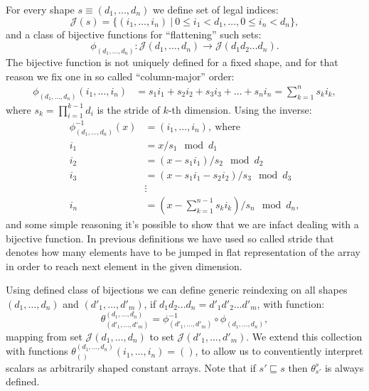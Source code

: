 \documentclass[a4paper, 10pt, draft]{report}
\begin{document}
For every shape $s \equiv (d_1, \ldots, d_n)$ we define set of legal indices:
\[
  \mathcal{J}\!(s) = \{ (i_1, \ldots, i_n)\ |\ 0 \leq i_1 < d_1, \ldots, 0 \leq i_n < d_n \},
\]
and a class of bijective functions for ``flattening'' such sets:
\[
  \phi_{(d_1,\ldots,d_n)} : \mathcal{J}\!(d_1,\ldots,d_n) \to \mathcal{J}\!(d_1 d_2 \ldots d_n).
\]
The bijective function is not uniquely defined for a fixed shape, and for that
reason we fix one in so called ``column-major'' order:
\begin{align*}
  \phi_{(d_1,\ldots,d_n)}\!(i_1,\ldots,i_n) & = s_1 i_1 + s_2 i_2 + s_3 i_3 + \ldots + s_n i_n = \sum_{k = 1}^{n} s_k i_k,
\end{align*}
where $s_k = \prod_{i=1}^{k-1} d_i$ is the stride of $k$-th dimension. Using the inverse:
\begin{align*}
  \phi_{(d_1,\ldots,d_n)}^{-1}\!(x) & = (i_1, \ldots, i_n),\ \text{where} \\
                                i_1 & = x / s_1 \mod d_1 \\
                                i_2 & = (x - s_1 i_1) / s_2 \mod d_2 \\
                                i_3 & = (x - s_1 i_1 - s_2 i_2) / s_3 \mod d_3 \\
                                    & \vdots \\
                                i_n & = (x - \sum_{k = 1}^{n-1} s_k i_k) / s_n \mod d_n,
\end{align*}
and some simple reasoning it's possible to show that we are infact dealing with
a bijective function. In previous definitions we have used so called stride
that denotes how many elements have to be jumped in flat representation of the
array in order to reach next element in the given dimension.

Using defined class of bijections we can define generic reindexing on
all shapes $(d_1,\ldots,d_n)$ and $(d'_1,\ldots,d'_m)$, if $d_1 d_2 \ldots d_n
= d'_1 d'_2 \ldots d'_m$, with function:
\[
  \theta_{(d'_1, \ldots, d'_m)}^{(d_1, \ldots, d_n)} = \phi_{(d'_1, \ldots, d'_m)}^{-1} \circ \phi_{(d_1, \ldots, d_n)},
\]
mapping from set $\mathcal{J}\!(d_1, \ldots, d_n)$ to set
$\mathcal{J}\!(d'_1,\ldots,d'_m)$. We extend this collection with functions
$\theta_{()}^{(d_1,\ldots,d_n)}(i_1, \ldots, i_n) = ()$, to allow us to
conventiently interpret scalars as arbitrarily shaped constant arrays. Note
that if $s' \sqsubseteq s$ then $\theta_{s'}^{s}$ is always defined.
\end{document}
